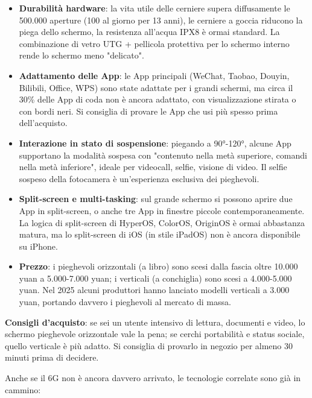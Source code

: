 \begin{itemize}
  \item \textbf{Durabilità hardware}: la vita utile delle cerniere supera diffusamente le 500.000 aperture (100 al giorno per 13 anni), le cerniere a goccia riducono la piega dello schermo, la resistenza all'acqua IPX8 è ormai standard. La combinazione di vetro UTG + pellicola protettiva per lo schermo interno rende lo schermo meno "delicato".
  \item \textbf{Adattamento delle App}: le App principali (WeChat, Taobao, Douyin, Bilibili, Office, WPS) sono state adattate per i grandi schermi, ma circa il 30\% delle App di coda non è ancora adattato, con visualizzazione stirata o con bordi neri. Si consiglia di provare le App che usi più spesso prima dell'acquisto.
  \item \textbf{Interazione in stato di sospensione}: piegando a 90°-120°, alcune App supportano la modalità sospesa con "contenuto nella metà superiore, comandi nella metà inferiore", ideale per videocall, selfie, visione di video. Il selfie sospeso della fotocamera è un'esperienza esclusiva dei pieghevoli.
  \item \textbf{Split-screen e multi-tasking}: sul grande schermo si possono aprire due App in split-screen, o anche tre App in finestre piccole contemporaneamente. La logica di split-screen di HyperOS, ColorOS, OriginOS è ormai abbastanza matura, ma lo split-screen di iOS (in stile iPadOS) non è ancora disponibile su iPhone.
  \item \textbf{Prezzo}: i pieghevoli orizzontali (a libro) sono scesi dalla fascia oltre 10.000 yuan a 5.000-7.000 yuan; i verticali (a conchiglia) sono scesi a 4.000-5.000 yuan. Nel 2025 alcuni produttori hanno lanciato modelli verticali a 3.000 yuan, portando davvero i pieghevoli al mercato di massa.
\end{itemize}

\textbf{Consigli d'acquisto}: se sei un utente intensivo di lettura, documenti e video, lo schermo pieghevole orizzontale vale la pena; se cerchi portabilità e status sociale, quello verticale è più adatto. Si consiglia di provarlo in negozio per almeno 30 minuti prima di decidere.


Anche se il 6G non è ancora davvero arrivato, le tecnologie correlate sono già in cammino:

